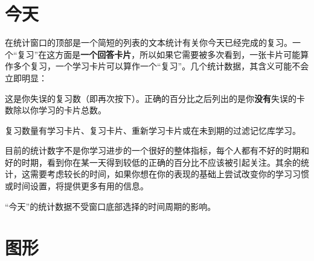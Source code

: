 \documentclass[a4paper]{book}
\begin{document}
		\section{今天}
		
		在统计窗口的顶部是一个简短的列表的文本统计有关你今天已经完成的复习。一个“复习”在这方面是\textbf{一个回答卡片}，所以如果它需要被多次看到，一张卡片可能算作多个复习，一个学习卡片可以算作一个“复习”。几个统计数据，其含义可能不会立即明显：
		
		\begin{description}
			\itemsep1pt\parskip0pt
			\item[再次计算] 这是你失误的复习数（即再次按下）。正确的百分比之后列出的是你\textbf{没有}失误的卡数除以你学习的卡片总数。
			\item[学习, 复习, 重新学习, 过滤] 复习数量有学习卡片、复习卡片、重新学习卡片或在未到期的过滤记忆库学习。               
		\end{description}
		
		目前的统计数字不是你学习进步的一个很好的整体指标，每个人都有不好的时期和好的时期，看到你在某一天得到较低的正确的百分比不应该被引起关注。其余的统计，这需要考虑较长的时间，如果你想在你的表现的基础上尝试改变你的学习习惯或时间设置，将提供更多有用的信息。
		
		“今天”的统计数据不受窗口底部选择的时间周期的影响。
		\section{图形}
		
\end{document}

